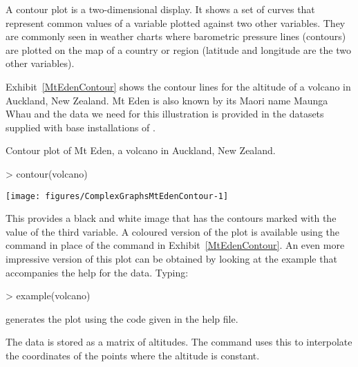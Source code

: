 A contour plot is a two-dimensional display. It shows a set of curves that represent common values of a variable plotted against two other variables. They are commonly seen in weather charts where barometric pressure lines (contours) are plotted on the map of a country or region (latitude and longitude are the two other variables). 
 
Exhibit~\ref{MtEdenContour} shows the contour lines for the altitude of a volcano in Auckland, New Zealand. Mt Eden is also known by its Maori name Maunga Whau and the data we need for this illustration is provided in the datasets supplied with base installations of \R{}. 
\begin{exhibit} 
\begin{center} 
\caption{Contour plot of Mt Eden, a volcano in Auckland, New Zealand.} 
\label{MtEdenContour} 

\begin{Schunk}
\begin{Sinput}
> contour(volcano) 
\end{Sinput}

\texttt{[image: figures/ComplexGraphsMtEdenContour-1]} \end{Schunk}

\end{center} 
\end{exhibit} 
 
This provides a black and white image that has the contours marked with the value of the third variable. A coloured version of the plot is available using the  command in place of the  command in Exhibit~\ref{MtEdenContour}. An even more impressive version of this plot can be obtained by looking at the example that accompanies the help for the  data. Typing: 

\begin{Schunk}
\begin{Sinput}
> example(volcano) 
\end{Sinput}
\end{Schunk}

generates the plot using the code given in the help file. 
 
The  data is stored as a matrix of altitudes. The  command uses this to interpolate the coordinates of the points where the altitude is constant. 
 
